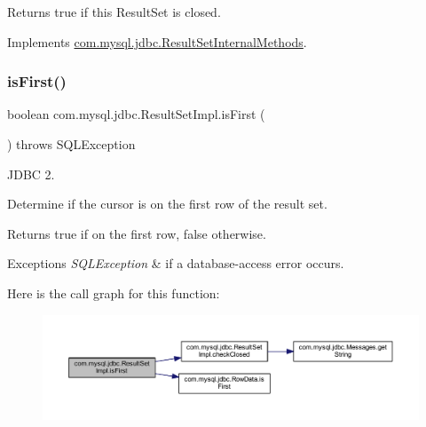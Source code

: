 Returns true if this Result\+Set is closed. 

Implements \mbox{\hyperlink{interfacecom_1_1mysql_1_1jdbc_1_1_result_set_internal_methods_ab7d1d10caf4c61a3472928f695361c24}{com.\+mysql.\+jdbc.\+Result\+Set\+Internal\+Methods}}.

\mbox{\label{classcom_1_1mysql_1_1jdbc_1_1_result_set_impl_aca7c9fb309227d5c865643946ea0da46}} 
\subsubsection{\texorpdfstring{is\+First()}{isFirst()}}
{\footnotesize\ttfamily boolean com.\+mysql.\+jdbc.\+Result\+Set\+Impl.\+is\+First (\begin{DoxyParamCaption}{ }\end{DoxyParamCaption}) throws S\+Q\+L\+Exception}

J\+D\+BC 2.

Determine if the cursor is on the first row of the result set. 

\begin{DoxyReturn}{Returns}
true if on the first row, false otherwise.
\end{DoxyReturn}

\begin{DoxyExceptions}{Exceptions}
{\em S\+Q\+L\+Exception} & if a database-\/access error occurs. \\
\hline
\end{DoxyExceptions}
Here is the call graph for this function\+:
\nopagebreak
\begin{figure}[H]
\begin{center}
\leavevmode
\includegraphics[width=350pt]{classcom_1_1mysql_1_1jdbc_1_1_result_set_impl_aca7c9fb309227d5c865643946ea0da46_cgraph}
\end{center}
\end{figure}
\mbox{\label{classcom_1_1mysql_1_1jdbc_1_1_result_set_impl_a2eda2389a04bce0a5b22f64bc7b80dab}} 

